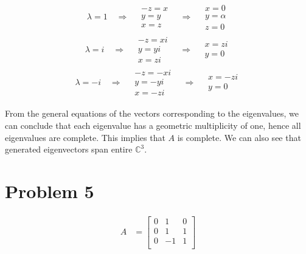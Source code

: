 \documentclass[10pt,letter]{article}
\begin{document}
\begin{gather*}
\lambda = 1 \quad \Rightarrow \quad
\begin{aligned}
-z = x
\\
y = y
\\
x = z
\end{aligned}
\quad \Rightarrow \quad
\begin{aligned}
x = 0
\\
y = \alpha
\\
z = 0
\end{aligned}
\end{gather*}
\begin{gather*}
\lambda = i \quad \Rightarrow \quad
\begin{aligned}
-z = xi
\\
y = yi
\\
x = zi
\end{aligned}
\quad \Rightarrow \quad
\begin{aligned}
x = zi
\\
y = 0
\end{aligned}
\end{gather*}
\begin{gather*}
\lambda = -i \quad \Rightarrow \quad
\begin{aligned}
-z = -xi
\\
y = -yi
\\
x = -zi
\end{aligned}
\quad \Rightarrow \quad
\begin{aligned}
x = -zi
\\
y = 0
\end{aligned}
\end{gather*}

From the general equations of the vectors corresponding to the eigenvalues, we can conclude that each eigenvalue has a geometric multiplicity of one, hence all eigenvalues are complete. This implies that $A$ is complete. We can also see that generated eigenvectors span entire $\mathbb{C}^3$.

\section*{Problem 5}

\begin{align*}
A &=
\left[ {\begin{array}{ccc}
 0 & 1 & 0 \\
 0 &  1 & 1 \\
 0 &  -1 & 1 \\
\end{array} } \right]
\end{align*}
\end{document}

